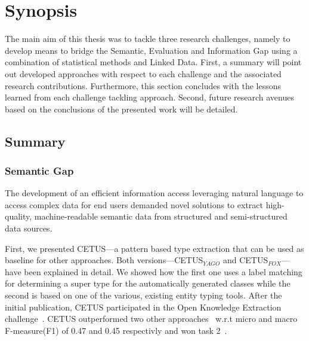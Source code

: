 \chapter{Synopsis}





The main aim of this thesis was to tackle three research challenges, namely to develop means to bridge the Semantic, Evaluation and Information Gap using a combination of statistical methods and Linked Data. 
First, a summary will point out developed approaches with respect to each challenge and the associated research contributions. 
Furthermore, this section concludes with the lessons learned from each challenge tackling approach.
Second, future research avenues based on the conclusions of the presented work will be detailed.
 
\section{Summary}
\subsection*{Semantic Gap}

The development of an efficient information access leveraging natural language to access complex data for end users demanded novel solutions to extract high-quality, machine-readable semantic data from structured and semi-structured data sources.

First, we presented CETUS---a pattern based type extraction that can be used as baseline for other approaches.
Both versions---CETUS$_{YAGO}$ and CETUS$_{FOX}$---have been explained in detail.
We showed how the first one uses a label matching for determining a super type for the automatically generated classes while the second is based on one of the various, existing entity typing tools.
After the initial publication, CETUS participated in the Open Knowledge Extraction challenge~\cite{okechallenge}.
CETUS outperformed two other approaches~\cite{fred_typing,oak_sheffield} w.r.t  micro and macro F-measure(F1) of 0.47 and 0.45 respectivly and won task 2~\cite{okechallenge}.	

